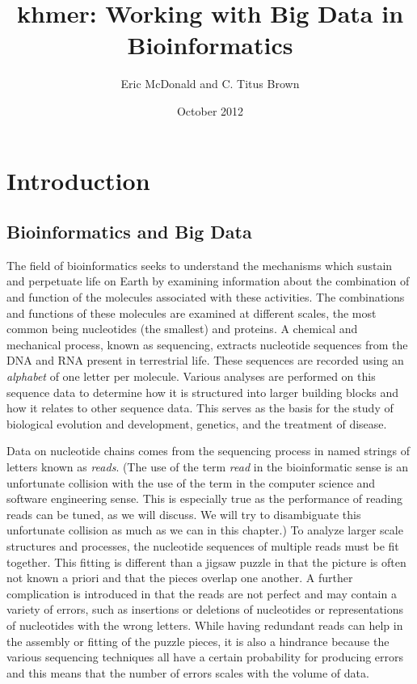 \documentclass{article}
\title{khmer: Working with Big Data in Bioinformatics}
\author{Eric McDonald and C. Titus Brown}
\date{October 2012}
\begin{document}
\maketitle


\section{Introduction}

\subsection{Bioinformatics and Big Data}


The field of bioinformatics seeks to understand the mechanisms which sustain and perpetuate life on Earth by examining information about the combination of and function of the molecules associated with these activities. The combinations and functions of these molecules are examined at different scales, the most common being nucleotides (the smallest) and proteins. A chemical and mechanical process, known as sequencing, extracts nucleotide sequences from the DNA and RNA present in terrestrial life. These sequences are recorded using an \textit{alphabet} of one letter per molecule. Various analyses are performed on this sequence data to determine how it is structured into larger building blocks and how it relates to other sequence data. This serves as the basis for the study of biological evolution and development, genetics, and the treatment of disease.

Data on nucleotide chains comes from the sequencing process in named strings of letters known as \textit{reads}. (The use of the term \textit{read} in the bioinformatic sense is an unfortunate collision with the use of the term in the computer science and software engineering sense. This is especially true as the performance of reading reads can be tuned, as we will discuss. We will try to disambiguate this unfortunate collision as much as we can in this chapter.) To analyze larger scale structures and processes, the nucleotide sequences of multiple reads must be fit together. This fitting is different than a jigsaw puzzle in that the picture is often not known a priori and that the pieces overlap one another. A further complication is introduced in that the reads are not perfect and may contain a variety of errors, such as insertions or deletions of nucleotides or representations of nucleotides with the wrong letters. While having redundant reads can help in the assembly or fitting of the puzzle pieces, it is also a hindrance because the various sequencing techniques all have a certain probability for producing errors and this means that the number of errors scales with the volume of data.
\end{document}
